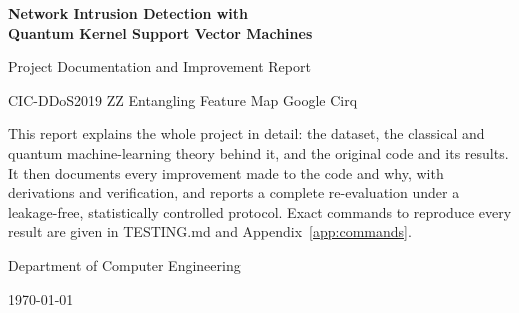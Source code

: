 \documentclass[11pt,a4paper]{article}
\newcommand{\codeus}{\textunderscore\allowbreak}
\newcommand{\code}[1]{{\small\ttfamily\let\_\codeus #1}}
\begin{document}
\begin{titlepage}
\centering
\vspace*{2.5cm}
{\LARGE\bfseries Network Intrusion Detection with\\[4pt] Quantum Kernel Support Vector Machines\par}
\vspace{0.8cm}
{\Large Project Documentation and Improvement Report\par}
\vspace{0.4cm}
{\large CIC-DDoS2019 \textbullet{} ZZ Entangling Feature Map \textbullet{} Google Cirq\par}
\vspace{2cm}
\begin{minipage}{0.82\linewidth}
\small
This report explains the whole project in detail: the dataset, the classical and quantum
machine-learning theory behind it, and the original code and its results. It then documents
every improvement made to the code and why, with derivations and verification, and reports a
complete re-evaluation under a leakage-free, statistically controlled protocol. Exact commands
to reproduce every result are given in \code{TESTING.md} and Appendix~\ref{app:commands}.
\end{minipage}
\vfill
{\large Department of Computer Engineering\par}
\vspace{0.3cm}
{\normalsize \today\par}
\end{titlepage}
\end{document}
